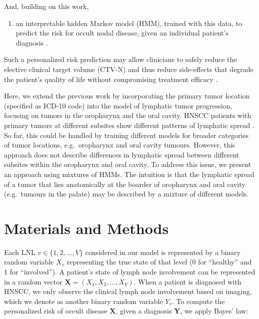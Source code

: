 \documentclass[11pt,twocolumn,twoside]{article}
\providecommand{\tightlist}{%
  \setlength{\itemsep}{0pt}\setlength{\parskip}{0pt}}\usepackage{longtable,booktabs,array}
\begin{document}
And, building on this work,

\begin{enumerate}
\def\labelenumi{\arabic{enumi}.}
\setcounter{enumi}{1}
\tightlist
\item
  an interpretable hidden Markov model (HMM), trained with this data, to
  predict the risk for occult nodal disease, given an individual patient's
  diagnosis \autocite{ludwig_hidden_2021}.
\end{enumerate}

Such a personalized risk prediction may allow clinicians to safely
reduce the elective clinical target volume (CTV-N) and thus reduce
side-effects that degrade the patient's quality of life without compromising treatment efficacy
\autocite{batth_practical_2014}.

Here, we extend the previous work by incorporating the primary tumor
location (specified as ICD-10 code) into the model of lymphatic tumor
progression, focusing on tumors in the oropharynx and the oral cavity.
HNSCC patients with primary tumors at different subsites show different
patterns of lymphatic spread
\autocite{lindberg_distribution_1972,woolgar_histological_1999}. So far,
this could be handled by training different models for broader
categories of tumor locations, e.g.~oropharynx and oral cavity tumours.
However, this approach does not describe differences in lymphatic spread
between different subsites within the oropharynx and oral cavity. To
address this issue, we present an approach using mixtures of HMMs. The
intuition is that the lymphatic spread of a tumor that lies anatomically
at the boarder of oropharynx and oral cavity (e.g.~tumours in the
palate) may be described by a mixture of different models.

\section{Materials and Methods}\label{sec-materials-and-methods}

Each LNL \(v \in \{ 1, 2, \ldots, V\}\) considered in our model is
represented by a binary random variable \(X_v\) representing the
true state of that level (0 for ``healthy'' and 1 for ``involved''). A
patient's state of lymph node involvement can be represented in a random
vector \(\mathbf{X} = \left( X_1, X_2, \ldots, X_V \right)\). When a
patient is diagnosed with HNSCC, we only observe the clinical lymph node
involvement based on imaging, which we denote as another binary random
variable \(Y_v\). To compute the personalized risk of occult disease
\(\mathbf{X}\), given a diagnosis \(\mathbf{Y}\), we apply Bayes' law:
\end{document}

